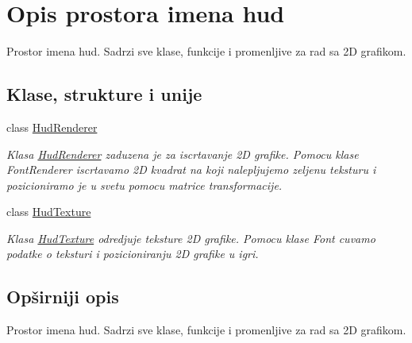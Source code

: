 \hypertarget{namespacehud}{}\section{Opis prostora imena hud}
\label{namespacehud}


Prostor imena hud. Sadrzi sve klase, funkcije i promenljive za rad sa 2D grafikom.  


\subsection*{Klase, strukture i unije}
\begin{DoxyCompactItemize}
\item 
class \hyperlink{classhud_1_1HudRenderer}{Hud\+Renderer}
\begin{DoxyCompactList}\small\item\em Klasa \hyperlink{classhud_1_1HudRenderer}{Hud\+Renderer} zaduzena je za iscrtavanje 2D grafike. Pomocu klase Font\+Renderer iscrtavamo 2D kvadrat na koji nalepljujemo zeljenu teksturu i pozicioniramo je u svetu pomocu matrice transformacije. \end{DoxyCompactList}\item 
class \hyperlink{classhud_1_1HudTexture}{Hud\+Texture}
\begin{DoxyCompactList}\small\item\em Klasa \hyperlink{classhud_1_1HudTexture}{Hud\+Texture} odredjuje teksture 2D grafike. Pomocu klase Font cuvamo podatke o teksturi i pozicioniranju 2D grafike u igri. \end{DoxyCompactList}\end{DoxyCompactItemize}


\subsection{Opširniji opis}
Prostor imena hud. Sadrzi sve klase, funkcije i promenljive za rad sa 2D grafikom. 